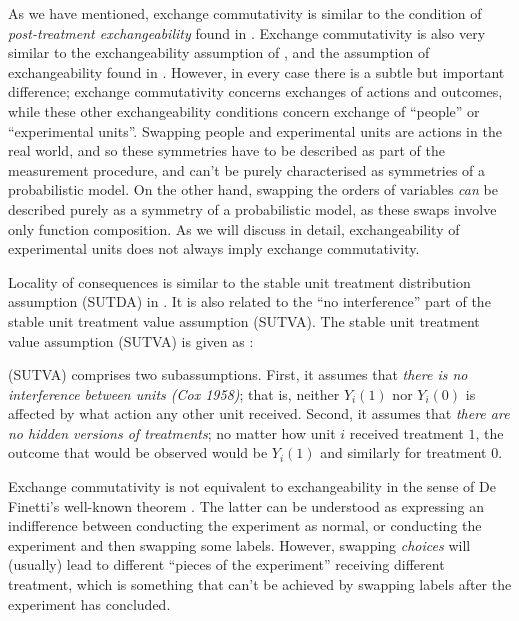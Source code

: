 As we have mentioned, exchange commutativity is similar to the condition of \emph{post-treatment exchangeability} found in \citet{dawid_decision-theoretic_2020}.  Exchange commutativity is also very similar to the exchangeability assumption of \citet{greenland_identifiability_1986}, and the assumption of exchangeability found in \citet{banerjee_chapter_2017}. However, in every case there is a subtle but important difference; exchange commutativity concerns exchanges of actions and outcomes, while these other exchangeability conditions concern exchange of ``people'' or ``experimental units''. Swapping people and experimental units are actions in the real world, and so these symmetries have to be described as part of the measurement procedure, and can't be purely characterised as symmetries of a probabilistic model. On the other hand, swapping the orders of variables \emph{can} be described purely as a symmetry of a probabilistic model, as these swaps involve only function composition. As we will discuss in detail, exchangeability of experimental units does not always imply exchange commutativity.

Locality of consequences is similar to the stable unit treatment distribution assumption (SUTDA) in \citet{dawid_decision-theoretic_2020}. It is also related to the ``no interference'' part of the stable unit treatment value assumption (SUTVA). The stable unit treatment value assumption (SUTVA) is given as \citep{rubin_causal_2005}:

\begin{blockquote}
(SUTVA) comprises two subassumptions. First, it assumes that \emph{there is no interference between units (Cox 1958)}; that is, neither $Y_i(1)$ nor $Y_i(0)$ is affected by what action any other unit received. Second, it assumes that \emph{there are no hidden versions of treatments}; no matter how unit $i$ received treatment $1$, the outcome that would be observed would be $Y_i(1)$ and similarly for treatment $0$.
\end{blockquote}


Exchange commutativity is not equivalent to exchangeability in the sense of De Finetti's well-known theorem \citet{de_finetti_foresight_1992}. The latter can be understood as expressing an indifference between conducting the experiment as normal, or conducting the experiment and then swapping some labels. However, swapping \emph{choices} will (usually) lead to different ``pieces of the experiment'' receiving different treatment, which is something that can't be achieved by swapping labels after the experiment has concluded.

